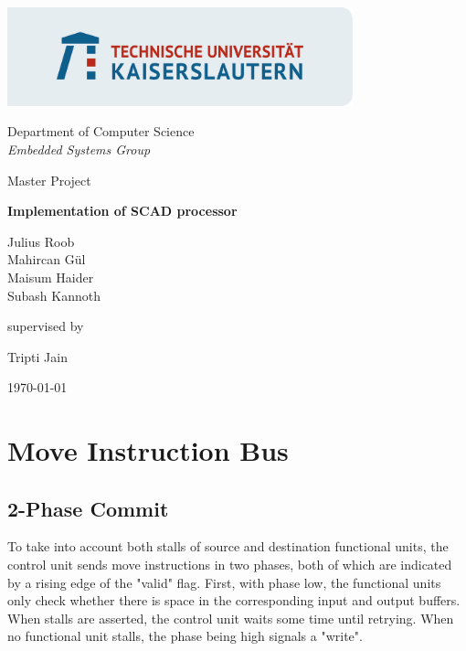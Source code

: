 \documentclass[adraft]{eptcs}
\begin{document}
\begin{titlepage}
	\title{}
	\centering
	\includegraphics[width=0.75\textwidth]{TUKL_LOGO_FELD_LINKS_RGB}\par\vspace{1cm}
	{\Large Department of Computer Science \\ \it Embedded Systems Group \par}
	\vspace{1cm}
	{\Large Master Project\par}
	\vspace{1.5cm}
	{\huge\bfseries Implementation of SCAD processor \par}
	\vspace{2cm}
	{\Large Julius Roob \\ Mahircan G{\"u}l \\ Maisum Haider \\ Subash Kannoth \par}
	\vfill
	supervised by\par
	\Large{Tripti Jain}
	\vfill
	{\large \today\par}
\end{titlepage}

	 \newpage
	\tableofcontents \newpage
	\listoftodos \newpage
	
	
	
	\section{Move Instruction Bus}
		\subsection{2-Phase Commit}
			To take into account both stalls of source and destination functional units, the control unit sends move instructions in two phases, both of which are indicated by a rising edge of the "valid" flag.
			First, with phase low, the functional units only check whether there is space in the corresponding input and output buffers.
			When stalls are asserted, the control unit waits some time until retrying.
			When no functional unit stalls, the phase being high signals a "write".
			
\end{document}
